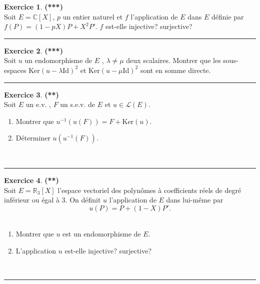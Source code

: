 \documentclass[a4paper,11pt]{article}
\theoremstyle{definition}
\newtheorem{exo}{Exercice} %
\begin{document}
\begin{minipage}{1\linewidth}
\begin{minipage}[t]{0.48\linewidth}
\begin{exo}\textbf{(***)}\quad\\[0.2cm]
Soit $E=\mathbb C[X]$, $p$ un entier naturel et $f$ l'application de $E$ dans $E$ définie par
$f(P)=(1-pX)P+X^2P'$. $f$ est-elle injective? surjective?

\centering\rule{1\linewidth}{0.6pt}\end{exo}

\begin{exo}\textbf{(***)}\quad\\[0.2cm]
Soit $u$ un endomorphisme de $E$ , $\lambda \neq \mu$ deux scalaires.
Montrer que les sous-espaces $\text{Ker}(u - \lambda\text{Id})^2$ et $\text{Ker}(u - \mu\text{Id})^2$ sont en somme directe.
\hfill\\[-0.25cm]
\centering\rule{1\linewidth}{0.6pt}\end{exo}

\end{minipage}\hfill\vrule\hfill\begin{minipage}[t]{0.48\linewidth}\raggedright

\begin{exo}\textbf{(**)}\quad\\[0.2cm]
Soit $E$ un e.v. , $F$ un s.e.v. de $E$ et $u \in \mathcal L (E )$.
	\begin{enumerate}
		\item Montrer que $u^{-1} (u (F)) = F + \text{Ker}(u)$.
		\item Déterminer $u (u^{-1}(F ))$.
	\end{enumerate}
	\hfill\\[-0.25cm]
	\centering\rule{1\linewidth}{0.6pt}\end{exo}


\begin{exo}\textbf{(**)}\quad\\[0.2cm]
Soit $E=\mathbb R_3[X]$ l'espace vectoriel des polynômes à coefficients réels de degré inférieur ou égal à 3.
On définit $u$ l'application de $E$ dans lui-même par\quad\\[-0.4cm]
$$u(P)=P+(1-X)P'.$$\quad\\[-0.8cm]
\begin{enumerate}
	\item Montrer que $u$ est un endomorphisme de $E$.
	\item L'application $u$ est-elle injective? surjective?
\end{enumerate}
\hfill\\[-0.25cm]
\centering\rule{1\linewidth}{0.6pt}\end{exo}



\end{minipage}
\end{minipage}
\end{document}
